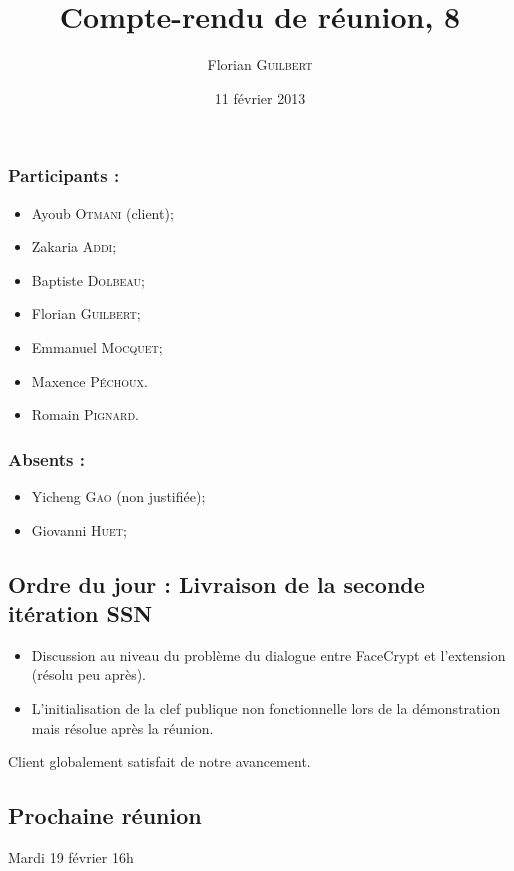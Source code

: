\documentclass[a4paper,10pt]{article}
\author{Florian \textsc{Guilbert}}
\title{Compte-rendu de réunion, 8}
\date{11 février 2013}
\begin{document}
\maketitle

\subsubsection*{Participants : }
\begin{itemize}
    \item Ayoub \textsc{Otmani} (client);
    \item Zakaria \textsc{Addi};
    \item Baptiste \textsc{Dolbeau};
    \item Florian \textsc{Guilbert};
    \item Emmanuel \textsc{Mocquet};
    \item Maxence  \textsc{Péchoux}.
    \item Romain \textsc{Pignard}.
\end{itemize}

\subsubsection*{Absents : }
\begin{itemize}
    \item Yicheng \textsc{Gao} (non justifiée);
    \item Giovanni \textsc{Huet};
\end{itemize}

\subsection*{Ordre du jour : Livraison de la seconde itération SSN}

\begin{itemize}
\item Discussion au niveau du problème du dialogue entre FaceCrypt et l'extension
(résolu peu après).
\item L'initialisation de la clef publique non fonctionnelle lors de la 
démonstration mais résolue après la réunion.
\end{itemize}

Client globalement satisfait de notre avancement.

\subsection*{Prochaine réunion}
    Mardi 19 février 16h
    
\end{document}
